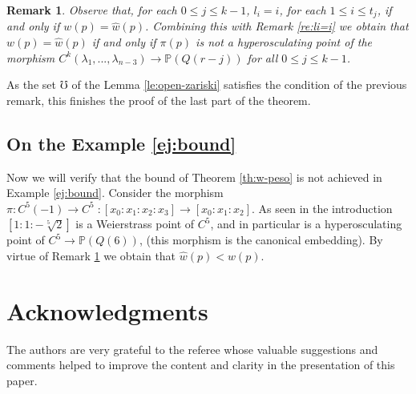 \documentclass{amsart}
\newcommand{\C}[3]{\ensuremath{C^{#1}(#3_1,...,#3_{#2})}}
\newtheorem{remark}[theorem]{Remark}
\begin{document}
\begin{remark}
\label{re:weie-weight}
Observe that, for each $0\leq j\leq k-1$,  $l_i=i$, for each $1\leq i\leq t_j$, if and only if  $w(p)=\hat{w}(p)$.  Combining this with 
Remark \ref{re:li=i} we obtain that $w(p)=\hat{w}(p)$ if and only if  $\pi(p)$ is not a hyperosculating point of the morphism $\C{k}{n-3}{\lambda}\rightarrow {\mathbb{P}}(Q(r-j))$
for all  $0\leq j\leq k-1$.
\end{remark}


As the  set $\mho$ of the Lemma \ref{le:open-zariski} satisfies the condition of the previous remark, this finishes the proof of the last part of the theorem.  


\subsection{On the Example \ref{ej:bound}}\label{Sec:finalejemplo}
Now we will verify that the bound of Theorem \ref{th:w-peso} is not achieved in Example \ref{ej:bound}.
Consider the morphism 
$\pi: C^5(-1)\rightarrow C^5\; :[x_0:x_1:x_2:x_3]\rightarrow [x_0:x_1:x_2].$
As seen  in the introduction $[1:1:-\sqrt[5]{2}]$ is a  Weierstrass point of $C^5$, and in particular is a hyperosculating point of $C^5\rightarrow {\mathbb{P}}(Q(6))$, 
(this morphism is the canonical embedding).  By virtue of Remark \ref{re:weie-weight} we obtain that $\hat{w}(p)<w(p)$.   



\section*{Acknowledgments} 
The authors are very grateful to the referee whose valuable suggestions and comments helped to improve the content and clarity in the presentation of this paper.
\end{document}
